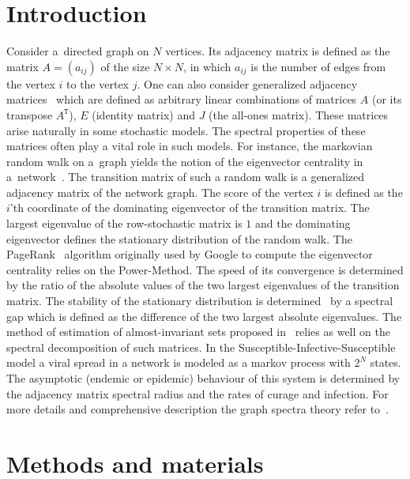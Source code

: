 \documentclass[a4paper]{jpconf}
\begin{document}
\section{Introduction}
Consider a~directed graph on \( N \) vertices.
Its adjacency matrix is defined as
    the matrix
    \( A = (a_{ij}) \)
    of the size \( N\times N \),
    in which \( a_{ij} \)
    is the number of edges
    from the vertex \( i \)
    to the vertex \( j \).
One can also consider generalized
    adjacency matrices~\cite{van2003graphs}
    which are defined as
    arbitrary linear combinations
    of matrices \( A \) (or its transpose \( A^\mathtt{T} \)),
    \( E \) (identity matrix)
    and \( J \) (the all-ones matrix).
These matrices arise naturally
    in some stochastic models.
The spectral  properties of these matrices
    often play a vital role in such models.
For instance, the markovian random walk on a~graph
    yields the notion of the eigenvector centrality
    in a~network~\cite{bonacich1972factoring}.
The transition matrix of such a random walk
    is a generalized adjacency matrix of the network graph.
The score of the vertex \( i \)
    is defined as the \( i \)'th coordinate
    of the dominating eigenvector
    of the transition matrix.
The largest eigenvalue of the row-stochastic matrix
    is \( 1 \) and the dominating eigenvector
    defines the stationary distribution
    of the random walk.
The PageRank~\cite{ilprints422} algorithm
    originally used by Google
    to compute the eigenvector centrality
    relies on the Power-Method.
The speed of its convergence
    is determined by the ratio
    of the absolute values of
    the two largest eigenvalues
    of the transition matrix.
The stability of the stationary distribution
    is determined~\cite{chakrabarti2008epidemic,wang2003epidemic} by a spectral gap
    which is defined as the difference of
    the two largest absolute eigenvalues.
The method of estimation of almost-invariant sets proposed in~\cite{schwartz2006fluctuation}
    relies as well on the spectral decomposition of such matrices.
In the Susceptible-Infective-Susceptible model
    a viral spread in a network
    is modeled as a markov process
    with \( 2^N \) states.
The asymptotic (endemic or epidemic) behaviour of this system
    is determined by the adjacency matrix spectral radius
    and the rates of curage and infection.
For more details and comprehensive description
    the graph spectra theory
    refer to~\cite{cvetkovic1980spectra,godsil2013algebraic}.

\section{Methods and materials}
\end{document}
